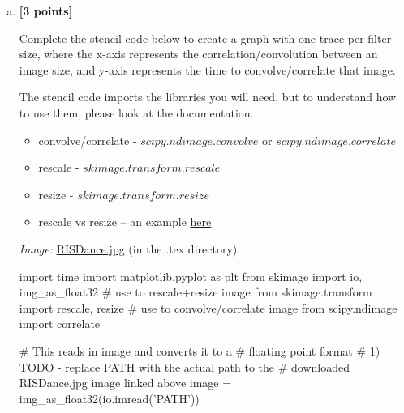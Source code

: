 \documentclass[11pt]{article}
\begin{document}
\begin{enumerate}[(a)]
\item
    \textbf{[3 points]}
    \begin{tcolorbox}[colback=orange!5!white,colframe=orange!75!black]
    Complete the stencil code below to create a graph with one trace per filter size, where the x-axis represents the correlation/convolution between an image size, and y-axis represents the time to convolve/correlate that image.

    The stencil code imports the libraries you will need, but to understand how to use them, please look at the documentation.
    
    \begin{itemize}
    \item convolve/correlate - \href{https://docs.scipy.org/doc/scipy/reference/generated/scipy.ndimage.convolve.html}{$scipy.ndimage.convolve$} or \href{https://docs.scipy.org/doc/scipy/reference/generated/scipy.ndimage.correlate.html}{$scipy.ndimage.correlate$}
    \item rescale - \href{https://scikit-image.org/docs/dev/api/skimage.transform.html#skimage.transform.rescale}{$skimage.transform.rescale$}
    \item resize - \href{https://scikit-image.org/docs/dev/api/skimage.transform.html#skimage.transform.resize}{$skimage.transform.resize$}
    \item rescale vs resize – an example \href{http://scikit-image.org/docs/dev/auto_examples/transform/plot_rescale.html}{here}
    \end{itemize}
    
    \end{tcolorbox}

\emph{Image:} \href{RISDance.jpg}{RISDance.jpg} (in the .tex directory).

\begin{tcolorbox}[enhanced jigsaw,breakable,pad at break*=1mm,colback=white!5!white,colframe=green!75!black,height fixed for=all]

\begin{python}
import time
import matplotlib.pyplot as plt
from skimage import io, img_as_float32
# use to rescale+resize image
from skimage.transform import rescale, resize
# use to convolve/correlate image
from scipy.ndimage import correlate

# This reads in image and converts it to a 
# floating point format
# 1) TODO - replace PATH with the actual path to the
#    downloaded RISDance.jpg image linked above
image = img_as_float32(io.imread('PATH'))


\end{python}
\end{tcolorbox}
\end{enumerate}
\end{document}
